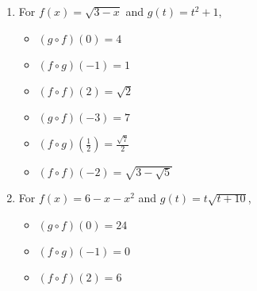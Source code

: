 \documentclass{ximera}
\begin{document}
\begin{enumerate}
\item  For $f(x) = \sqrt{3-x}$ and $g(t) = t^2+1$,
\begin{multicols}{3}

\begin{itemize}

\item  $(g\circ f)(0) = 4$

\item  $(f\circ g)(-1) = 1$

\item  $(f \circ f)(2) = \sqrt{2}$

\end{itemize}

\end{multicols}

\begin{multicols}{3}

\begin{itemize}

\item  $(g\circ f)(-3) = 7$

\item  $(f\circ g)\left(\frac{1}{2}\right) = \frac{\sqrt{7}}{2}$

\item  $(f \circ f)(-2) = \sqrt{3 - \sqrt{5}}$

\end{itemize}

\end{multicols}

\enlargethispage{0.5in}

\item  For  $f(x) = 6-x-x^2$ and $g(t) = t\sqrt{t+10}$,
\begin{multicols}{3}

\begin{itemize}

\item  $(g\circ f)(0) = 24$

\item  $(f\circ g)(-1) = 0$

\item  $(f \circ f)(2) = 6$

\end{itemize}

\end{multicols}

\begin{multicols}{3}

\begin{itemize}


\end{itemize}
\end{multicols}
\end{enumerate}
\end{document}
